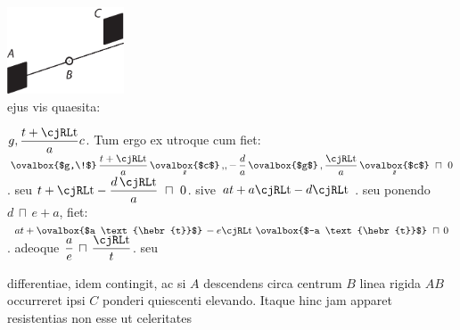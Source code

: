  \includegraphics[trim = 0mm -3mm 0mm 0mm, clip, width=0.26\textwidth]{images/lh0350911_008r-d1.pdf}\\
\pend
\vspace{1em}
\pstart
\noindent ejus vis quaesita:\rule[-4mm]{0mm}{10mm} $\displaystyle g,\frac{t+\text{\hebr{t}}}{a}c$.
Tum ergo 
ex utroque cum fiet:
$\displaystyle \ovalbox{$g,\!$}\, \frac{t+\text{\hebr{t}}}{a} \, \underset{\scriptscriptstyle{I\!\!I}}{\smash[b]{\ovalbox{$c$}}} \, ,\!, - \, \frac{d}{a} \,\ovalbox{$g$} \, , \frac{\text{\hebr{t}}}{a} \,\underset{\scriptscriptstyle{I\!\!I}}{\smash[b]{\ovalbox{$c$}}} \ \sqcap \ 0$.
seu $\displaystyle t + \text{\hebr{t}} - \frac{d \, \text{\hebr{t}}}{a} \ \sqcap \ 0$.
sive $\displaystyle at + a \text{\hebr{t}} - d \text{\hebr{t}}$
. seu ponendo $\displaystyle d \, \sqcap \, e + a$,
fiet: $\displaystyle at + \ovalbox{$a \text{\hebr{t}}$}\, - e \text{\hebr{t}} \ \ovalbox{$-a \text{\hebr{t}}$} \ \sqcap \, 0$. adeoque $\displaystyle \frac{a}{e} \, \sqcap \, \frac{\text{\hebr{t}}}{t}$.
seu \rule[-4mm]{0mm}{10mm}
differentiae, 
 idem contingit, ac si $\displaystyle A$ descendens circa centrum $\displaystyle B$ linea rigida $\displaystyle AB$ occurreret ipsi $\displaystyle C$ ponderi quiescenti elevando. Itaque hinc jam apparet resistentias non esse ut celeritates
